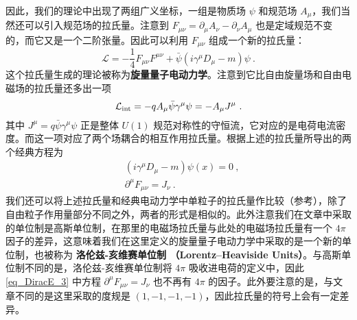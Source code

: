 因此，我们的理论中出现了两组广义坐标，一组是物质场 $\psi$ 和规范场 $A_\mu$，我们当然还可以引入规范场的拉氏量。注意到 $F_{\mu\nu} = \partial_\mu A_\nu - \partial_\nu A_\mu$ 也是定域规范不变的，而它又是一个二阶张量。因此可以利用 $F_{\mu\nu}$ 组成一个新的拉氏量：
\begin{equation}
\mathcal{L}=-\frac{1}{4}F_{\mu\nu}F^{\mu\nu} + \bar\psi (i\gamma^\mu D_\mu - m)\psi~.
\end{equation}
这个拉氏量生成的理论被称为\textbf{旋量量子电动力学}。注意到它比自由旋量场和自由电磁场的拉氏量还多出一项
\begin{equation}
\mathcal{L}_{\rm int}=-q A_\mu \bar\psi \gamma^\mu \psi=-A_\mu J^\mu~.
\end{equation}
其中 $J^\mu = q\bar\psi \gamma^\mu \psi$ 正是整体 $U(1)$ 规范对称性的守恒流，它对应的是电荷电流密度。而这一项对应了两个场耦合的相互作用拉氏量。根据上述的拉氏量所导出的两个经典方程为
\begin{equation}\label{eq_DiracE_3}
\begin{aligned}
&(i\gamma^\mu D_\mu - m)\psi(x)=0~,\\
&\partial^\mu F_{\mu\nu}=J_\nu~.
\end{aligned}
\end{equation}
我们还可以将上述拉氏量和经典电动力学中单粒子的拉氏量作比较（参考），除了自由粒子作用量部分不同之外，两者的形式是相似的。此外注意我们在文章中采取的单位制是高斯单位制，在那里的电磁场拉氏量与此处的电磁场拉氏量有一个 $4\pi$ 因子的差异，这意味着我们在这里定义的旋量量子电动力学中采取的是一个新的单位制，也被称为 \textbf{洛伦兹-亥维赛单位制 （Lorentz–Heaviside Units）}。与高斯单位制不同的是，洛伦兹-亥维赛单位制将 $4\pi$ 吸收进电荷的定义中，因此\autoref{eq_DiracE_3} 中方程 $\partial^\mu F_{\mu\nu}=J_\nu$ 也不再有 $4\pi$ 的因子。此外要注意的是，与文章不同的是这里采取的度规是 $(1,-1,-1,-1)$，因此拉氏量的符号上会有一定差异。
